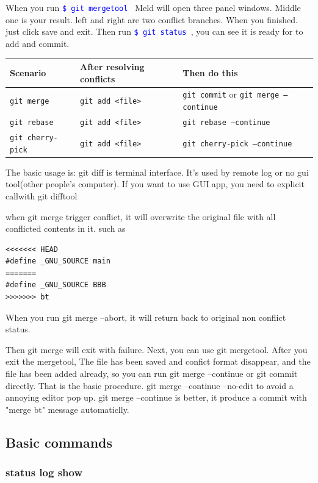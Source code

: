 \documentclass[paper=8.5in:11in, twoside, 12pt, pagesize=pdftex]{book}
\newcommand{\linuxcommand}[1]{\texttt{\textcolor{blue}{\$ #1 \Pisymbol{psy}{191}}}}
\begin{document}
	When you run \linuxcommand{git mergetool} Meld will open three panel windows. Middle one is your result. left and right are two conflict branches.  When you finished. just click save and exit. Then run \linuxcommand{git status}, you can see it is ready for to add and commit. 
	
\begin{tabular}{|l|l|l|}
	\hline
	\textbf{Scenario} & \textbf{After resolving conflicts} & \textbf{Then do this} \\
	\hline
	\texttt{git merge} & \texttt{git add <file>} & \texttt{git commit} or \texttt{git merge --continue} \\
	\hline
	\texttt{git rebase} & \texttt{git add <file>} & \texttt{git rebase --continue} \\
	\hline
	\texttt{git cherry-pick} & \texttt{git add <file>} & \texttt{git cherry-pick --continue} \\
	\hline
\end{tabular}
	
	The basic usage is: git diff is terminal interface. It's used by remote log or no gui tool(other people's computer). If you want to use GUI app, you need to explicit callwith git difftool
	
	when git merge trigger conflict, it will overwrite the original  file with all conflicted contents in it. such as
\begin{lstlisting}
<<<<<<< HEAD
#define _GNU_SOURCE main
=======
#define _GNU_SOURCE BBB
>>>>>>> bt
\end{lstlisting}
	When you run git merge --abort, it will return back to original non conflict status. 
	
	Then git merge will exit with failure. Next, you can use git mergetool. After you exit the mergetool, The file has been saved and confict format disappear, and the file has been added already, so you can run git merge --continue or git commit directly. That is the basic procedure. git merge --continue --no-edit to avoid a annoying editor pop up. git merge --continue is better, it produce a commit with "merge bt" message automaticlly.
	
\subsection{Basic commands}
\subsubsection{status log show}
\end{document}
